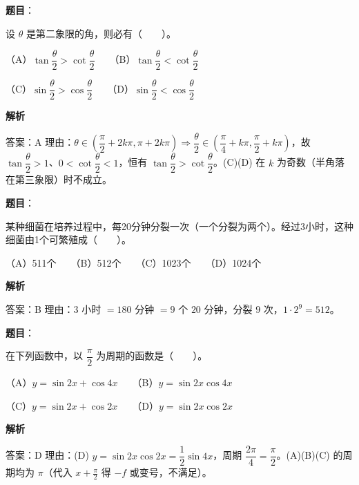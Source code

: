 \begin{answer}

\textbf{题目}：

设 $\theta$ 是第二象限的角，则必有\mbox{（　　）}。

（A）$\tan\dfrac\theta2>\cot\dfrac\theta2$　　（B）$\tan\dfrac\theta2<\cot\dfrac\theta2$

（C）$\sin\dfrac\theta2>\cos\dfrac\theta2$　　（D）$\sin\dfrac\theta2<\cos\dfrac\theta2$

\textbf{解析}

答案：A
理由：$\theta\in\left(\dfrac\pi2+2k\pi,\pi+2k\pi\right)\Rightarrow\dfrac\theta2\in\left(\dfrac\pi4+k\pi,\dfrac\pi2+k\pi\right)$，故 $\tan\dfrac\theta2>1$、$0<\cot\dfrac\theta2<1$，恒有 $\tan\dfrac\theta2>\cot\dfrac\theta2$。(C)(D) 在 $k$ 为奇数（半角落在第三象限）时不成立。


\end{answer}
\begin{answer}

\textbf{题目}：

某种细菌在培养过程中，每20分钟分裂一次（一个分裂为两个）。经过3小时，这种细菌由1个可繁殖成\mbox{（　　）}。

（A）511个　　（B）512个　　（C）1023个　　（D）1024个

\textbf{解析}

答案：B
理由：$3$ 小时 $=180$ 分钟 $=9$ 个 $20$ 分钟，分裂 $9$ 次，$1\cdot 2^9=512$。


\end{answer}
\begin{answer}

\textbf{题目}：

在下列函数中，以 $\dfrac\pi2$ 为周期的函数是\mbox{（　　）}。

（A）$y=\sin2x+\cos4x$　　（B）$y=\sin2x\cos4x$

（C）$y=\sin2x+\cos2x$　　（D）$y=\sin2x\cos2x$

\textbf{解析}

答案：D
理由：(D) $y=\sin2x\cos2x=\dfrac12\sin4x$，周期 $\dfrac{2\pi}{4}=\dfrac\pi2$。(A)(B)(C) 的周期均为 $\pi$（代入 $x+\frac\pi2$ 得 $-f$ 或变号，不满足）。


\end{answer}
